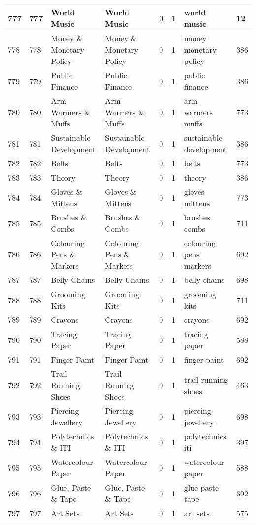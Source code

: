 \begin{longtable}{|l|l|l|l|l|l|l|l|}
777 & 777 & World Music & World Music & 0 & 1 & world music & 12 \\ \hline 
778 & 778 & Money \& Monetary Policy & Money \& Monetary Policy & 0 & 1 & money monetary policy & 386 \\ \hline 
779 & 779 & Public Finance & Public Finance & 0 & 1 & public finance & 386 \\ \hline 
780 & 780 & Arm Warmers \& Muffs & Arm Warmers \& Muffs & 0 & 1 & arm warmers muffs & 773 \\ \hline 
781 & 781 & Sustainable Development & Sustainable Development & 0 & 1 & sustainable development & 386 \\ \hline 
782 & 782 & Belts & Belts & 0 & 1 & belts & 773 \\ \hline 
783 & 783 & Theory & Theory & 0 & 1 & theory & 386 \\ \hline 
784 & 784 & Gloves \& Mittens & Gloves \& Mittens & 0 & 1 & gloves mittens & 773 \\ \hline 
785 & 785 & Brushes \& Combs & Brushes \& Combs & 0 & 1 & brushes combs & 711 \\ \hline 
786 & 786 & Colouring Pens \& Markers & Colouring Pens \& Markers & 0 & 1 & colouring pens markers & 692 \\ \hline 
787 & 787 & Belly Chains & Belly Chains & 0 & 1 & belly chains & 698 \\ \hline 
788 & 788 & Grooming Kits & Grooming Kits & 0 & 1 & grooming kits & 711 \\ \hline 
789 & 789 & Crayons & Crayons & 0 & 1 & crayons & 692 \\ \hline 
790 & 790 & Tracing Paper & Tracing Paper & 0 & 1 & tracing paper & 588 \\ \hline 
791 & 791 & Finger Paint & Finger Paint & 0 & 1 & finger paint & 692 \\ \hline 
792 & 792 & Trail Running Shoes & Trail Running Shoes & 0 & 1 & trail running shoes & 463 \\ \hline 
793 & 793 & Piercing Jewellery & Piercing Jewellery & 0 & 1 & piercing jewellery & 698 \\ \hline 
794 & 794 & Polytechnics \& ITI & Polytechnics \& ITI & 0 & 1 & polytechnics iti & 397 \\ \hline 
795 & 795 & Watercolour Paper & Watercolour Paper & 0 & 1 & watercolour paper & 588 \\ \hline 
796 & 796 & Glue, Paste \& Tape & Glue, Paste \& Tape & 0 & 1 & glue paste tape & 692 \\ \hline 
797 & 797 & Art Sets & Art Sets & 0 & 1 & art sets & 575 \\ \hline 

\end{longtable}
